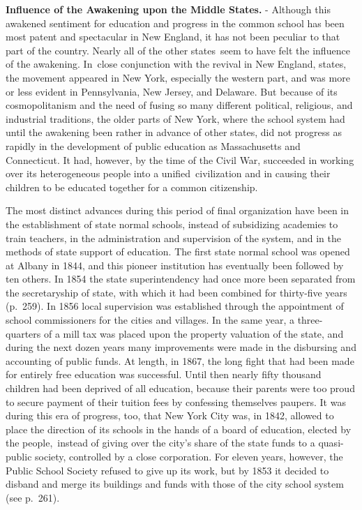 \documentclass[]{book}
\begin{document}
\textbf{Influence of the Awakening upon the Middle States.} - Although this awakened sentiment for education and progress in the common school has been most patent and spectacular in New England, it has not been peculiar to that part of the country. Nearly all of the other states~seem to have felt the influence of the awakening. In~close conjunction with the revival in New England, states, the movement appeared in New York, especially the western part, and was more or less evident in Pennsylvania, New Jersey, and Delaware. But because of its cosmopolitanism and the need of fusing so many different political, religious, and industrial traditions, the older parts of New York, where the school system had until the awakening been rather in advance of other states, did not progress as rapidly in the development of public education as Massachusetts and Connecticut. It had, however, by the time of the Civil War, succeeded in working over its heterogeneous people into a unified~civilization and in causing their children to be educated together for a common citizenship.

The most distinct advances during this period of final organization have been in the establishment of state normal schools, instead of subsidizing academies to train teachers, in the administration and supervision of the system, and in the methods of state support of education. The first state normal school was opened at Albany in 1844, and this pioneer institution has eventually been followed by ten others. In 1854 the state superintendency had once more been separated from the secretaryship of state, with which it had been combined for thirty-five years (p.~259). In 1856 local supervision was established through the appointment of school commissioners for the cities and villages. In the same year, a three-quarters of a mill tax was placed upon the property valuation of the state, and during the next dozen years many improvements were made in the disbursing and accounting of public funds. At length, in 1867, the long fight that had been made for entirely free education was successful. Until then nearly fifty thousand children had been deprived of all education, because their parents were too proud to secure payment of their tuition fees by confessing themselves paupers. It was during this era of progress, too, that New York City was, in 1842, allowed to place the direction of its schools in the hands of a board of education, elected by the people,~instead of giving over the city's share of the state funds to a quasi-public society, controlled by a close corporation. For eleven years, however, the Public School Society refused to give up its work, but by 1853 it decided to disband and merge its buildings and funds with those of the city school system (see p.~261).
\end{document}
